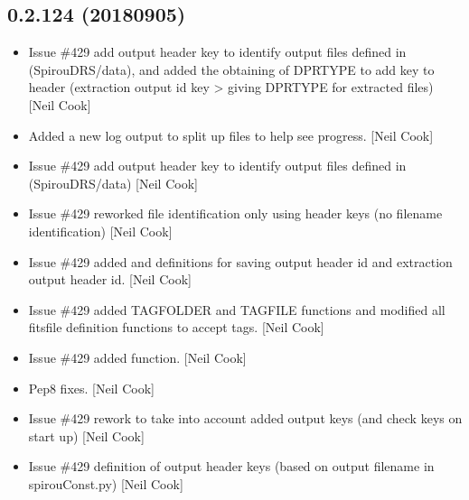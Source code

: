 \documentclass[a4paper,10pt,english]{report}
\begin{document}
\subsection{0.2.124 (2018\sphinxhyphen{}09\sphinxhyphen{}05)}
\label{\detokenize{misc/changelog:id355}}\begin{itemize}
\item {} 
Issue \#429 \sphinxhyphen{} add output header key to identify output files
 \sphinxhyphen{} defined in  (SpirouDRS/data), and added
the obtaining of DPRTYPE to add   key to header (extraction
output id key \textendash{}\textgreater{} giving DPRTYPE for extracted files) {[}Neil Cook{]}

\item {} 
Added a new log output to split up files to help see progress. {[}Neil
Cook{]}

\item {} 
Issue \#429 \sphinxhyphen{} add output header key to identify output files
 \sphinxhyphen{} defined in  (SpirouDRS/data) {[}Neil Cook{]}

\item {} 
Issue \#429 \sphinxhyphen{} re\sphinxhyphen{}worked file identification only using header keys (no
filename identification) {[}Neil Cook{]}

\item {} 
Issue \#429 \sphinxhyphen{} added  and  definitions for saving
output header id and extraction output header id. {[}Neil Cook{]}

\item {} 
Issue \#429 \sphinxhyphen{} added TAGFOLDER and TAGFILE functions and modified all
fits\sphinxhyphen{}file definition functions to accept tags. {[}Neil Cook{]}

\item {} 
Issue \#429 \sphinxhyphen{} added  function. {[}Neil Cook{]}

\item {} 
Pep8 fixes. {[}Neil Cook{]}

\item {} 
Issue \#429 \sphinxhyphen{} re\sphinxhyphen{}work  to take into account added
output keys (and check keys on start up) {[}Neil Cook{]}

\item {} 
Issue \#429 \sphinxhyphen{} definition of output header keys (based on output
filename in spirouConst.py) {[}Neil Cook{]}


\end{itemize}
\end{document}
